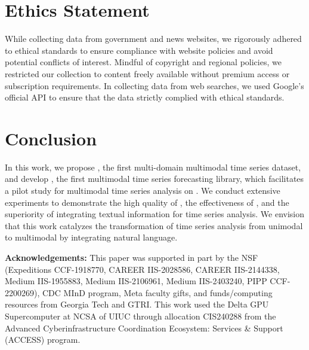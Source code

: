 \section{Ethics Statement} \label{subsec:ethics}
While collecting data from government and news websites, we rigorously adhered to ethical standards to ensure compliance with website policies and avoid potential conflicts of interest. Mindful of copyright and regional policies, we restricted our collection to content freely available without premium access or subscription requirements. In collecting data from web searches, we used Google's official API to ensure that the data strictly complied with ethical standards.
\section{Conclusion}
In this work, we propose \model, the first multi-domain multimodal time series dataset, and develop \mmtsf, the first multimodal time series forecasting library, which facilitates a pilot study for multimodal time series analysis on \model. We conduct extensive experiments to demonstrate the high quality of \model, the effectiveness of \mmtsf, and the superiority of integrating textual information for time series analysis. We envision that this work catalyzes the transformation of time series analysis from unimodal to multimodal by integrating natural language.
\par \textbf{Acknowledgements:} 
This paper was supported in part by the NSF (Expeditions CCF-1918770, CAREER IIS-2028586, CAREER IIS-2144338, Medium IIS-1955883, Medium IIS-2106961, Medium IIS-2403240, PIPP CCF-2200269), CDC MInD program, Meta faculty gifts, and funds/computing resources from Georgia Tech and GTRI. This work used the Delta GPU Supercomputer at NCSA of UIUC through allocation CIS240288 from the Advanced Cyberinfrastructure Coordination Ecosystem: Services \& Support (ACCESS) program.
